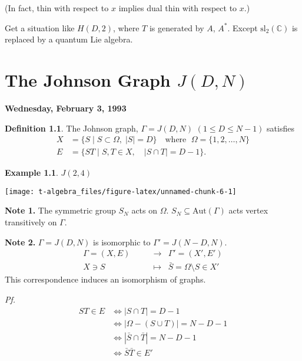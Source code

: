 \documentclass[
]{book}
\theoremstyle{definition}
\newtheorem{definition}{Definition}[chapter]
\theoremstyle{definition}
\newtheorem{example}{Example}[chapter]
\theoremstyle{definition}
\theoremstyle{definition}
\theoremstyle{remark}
\begin{document}
(In fact, thin with respect to \(x\) implies dual thin with respect to \(x\).)

Get a situation like \(H(D,2)\), where \(T\) is generated by \(A\), \(A^*\). Except \(\mathrm{sl}_2(\mathbb{C})\) is replaced by a quantum Lie algebra.

\hypertarget{lec7}{%
\chapter{\texorpdfstring{The Johnson Graph \(J(D,N)\)}{The Johnson Graph J(D,N)}}\label{lec7}}

\textbf{Wednesday, February 3, 1993}

\begin{definition}
The Johnson graph, \(\Gamma = J(D,N)\) \((1\leq D\leq N-1)\) satisfies
\begin{align}
X & = \{S\mid S\subset \Omega, \; |S| = D\} \quad\text{where }\; \Omega = \{1, 2, \ldots, N\}\\
E & = \{ST\mid S, T\in X, \quad |S\cap T| = D-1\}.
\end{align}
\end{definition}

\begin{example}

\(J(2,4)\)

\begin{center}\texttt{[image: t-algebra\_files/figure-latex/unnamed-chunk-6-1]} \end{center}

\end{example}

\textbf{Note 1.}
The symmetric group \(S_N\) acts on \(\Omega\). \(S_N \subseteq \mathrm{Aut}(\Gamma)\) acts vertex transitively on \(\Gamma\).

\textbf{Note 2.}
\(\Gamma = J(D,N)\) is isomorphic to \(\Gamma' = J(N-D,N)\).
\begin{align}
\Gamma = (X, E) & \qquad \longrightarrow & \Gamma' = (X', E')\\
X\ni S & \qquad \longmapsto & \bar{S} = \Omega\setminus S \in X'
\end{align}
This correspondence induces an isomorphism of graphs.

\emph{Pf.}
\begin{align}
ST\in E & \Leftrightarrow  |S\cap T| = D-1\\
  & \Leftrightarrow  |\Omega - (S\cup T)| = N-D-1\\
  & \Leftrightarrow  |\bar{S} \cap \bar{T}| = N-D-1\\
  & \Leftrightarrow  \bar{S}\bar{T} \in E'
\end{align}
\end{document}

